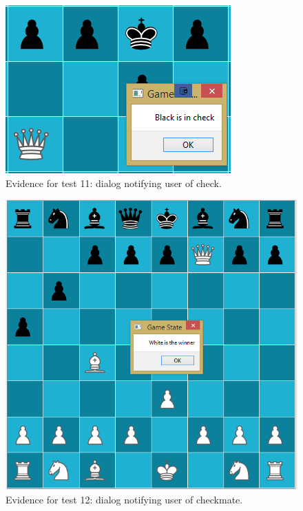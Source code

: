 \documentclass[twoside, 12pt]{report}
\begin{document}
\begin{figure}[H]
	\centering
	\includegraphics{images/screenshots/test-11}
	\caption{Evidence for test 11: dialog notifying user of check.}
	\label{test-11}
\end{figure}
\begin{figure}[H]
	\centering
	\includegraphics[width=1.0\textwidth]{images/screenshots/test-12}
	\caption{Evidence for test 12: dialog notifying user of checkmate.}
	\label{test-12}
\end{figure}
\end{document}
